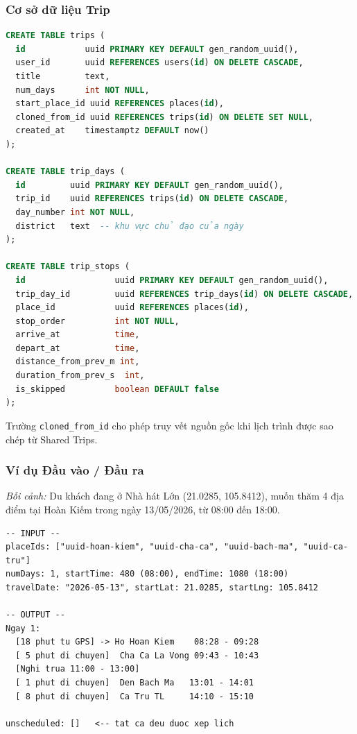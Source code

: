 \documentclass[12pt,a4paper]{article}
\begin{document}
\subsubsection{Cơ sở dữ liệu Trip}

\begin{lstlisting}[language=SQL]
CREATE TABLE trips (
  id            uuid PRIMARY KEY DEFAULT gen_random_uuid(),
  user_id       uuid REFERENCES users(id) ON DELETE CASCADE,
  title         text,
  num_days      int NOT NULL,
  start_place_id uuid REFERENCES places(id),
  cloned_from_id uuid REFERENCES trips(id) ON DELETE SET NULL,
  created_at    timestamptz DEFAULT now()
);

CREATE TABLE trip_days (
  id         uuid PRIMARY KEY DEFAULT gen_random_uuid(),
  trip_id    uuid REFERENCES trips(id) ON DELETE CASCADE,
  day_number int NOT NULL,
  district   text  -- khu vực chủ đạo của ngày
);

CREATE TABLE trip_stops (
  id                  uuid PRIMARY KEY DEFAULT gen_random_uuid(),
  trip_day_id         uuid REFERENCES trip_days(id) ON DELETE CASCADE,
  place_id            uuid REFERENCES places(id),
  stop_order          int NOT NULL,
  arrive_at           time,
  depart_at           time,
  distance_from_prev_m int,
  duration_from_prev_s  int,
  is_skipped          boolean DEFAULT false
);
\end{lstlisting}

Trường \texttt{cloned\_from\_id} cho phép truy vết nguồn gốc khi lịch trình
được sao chép từ Shared Trips.

\subsubsection{Ví dụ Đầu vào / Đầu ra}

\textit{Bối cảnh:} Du khách đang ở Nhà hát Lớn (21.0285, 105.8412), muốn thăm
4 địa điểm tại Hoàn Kiếm trong ngày 13/05/2026, từ 08:00 đến 18:00.

\begin{lstlisting}[language={}]
-- INPUT --
placeIds: ["uuid-hoan-kiem", "uuid-cha-ca", "uuid-bach-ma", "uuid-ca-tru"]
numDays: 1, startTime: 480 (08:00), endTime: 1080 (18:00)
travelDate: "2026-05-13", startLat: 21.0285, startLng: 105.8412

-- OUTPUT --
Ngay 1:
  [18 phut tu GPS] -> Ho Hoan Kiem    08:28 - 09:28
  [ 5 phut di chuyen]  Cha Ca La Vong 09:43 - 10:43
  [Nghi trua 11:00 - 13:00]
  [ 1 phut di chuyen]  Den Bach Ma   13:01 - 14:01
  [ 8 phut di chuyen]  Ca Tru TL     14:10 - 15:10

unscheduled: []   <-- tat ca deu duoc xep lich
\end{lstlisting}
\end{document}
